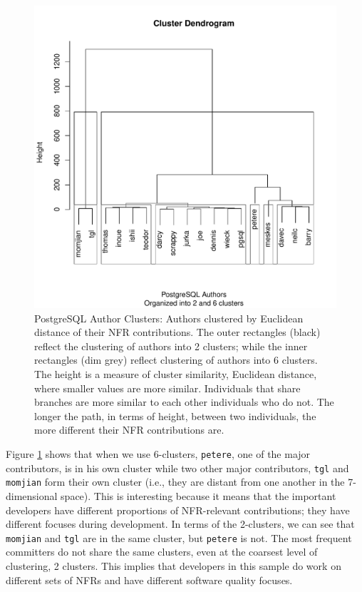 \documentclass[smallextended]{svjour3}       %
\begin{document}
\begin{figure}
  \centering
  \includegraphics[width=.9\textwidth]{figures/postgresql-author-cluster}
  \caption{PostgreSQL Author Clusters: Authors clustered by Euclidean
    distance of their NFR contributions. The outer rectangles (black)
    reflect the clustering of authors into 2 clusters; while the inner rectangles
    (dim grey) reflect clustering of authors into 6 clusters. The height is a
    measure of cluster similarity, Euclidean distance, where smaller
    values are more similar. Individuals that share
    branches are more similar to each other individuals who do
    not. The longer the path, in terms of height, between two
    individuals, the more different their NFR contributions are.}
\label{fig:authorcluster}
\end{figure}


Figure \ref{fig:authorcluster} shows that when we use $6$-clusters, 
\texttt{petere}, one of the major contributors, is in his own cluster
while two other major contributors, \texttt{tgl} and \texttt{momjian}
form their own cluster (i.e., they are distant from one another in the
7-dimensional space). 
This is interesting because it means that the important developers
have different proportions of NFR-relevant contributions; they have different
focuses during development. In terms of the 2-clusters, we can see that \texttt{momjian}
and \texttt{tgl} are in the same cluster, but \texttt{petere} is
not. The most frequent committers do not share the same clusters, even
at the coarsest level of clustering, 2 clusters.  This implies that developers in
this sample do work on different sets of NFRs and have different
software quality focuses.
\end{document}
